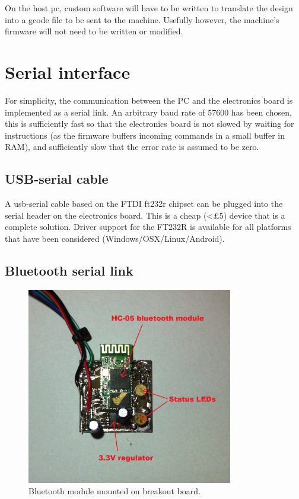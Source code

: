 \documentclass[a4paper,11pt]{article}  %
\begin{document}
On the host pc, custom software will have to be written to translate the design into a gcode file to be sent to the machine. Usefully however,
the machine's firmware will not need to be written or modified.

\section{Serial interface}
For simplicity, the communication between the PC and the electronics board is implemented as a serial link. An arbitrary baud rate of 57600 has been
chosen, this is sufficiently fast so that the electronics board is not slowed by waiting for instructions (as the firmware buffers incoming commands in
a small buffer in RAM), and sufficiently slow that the error rate is assumed to be zero.

\subsection{USB-serial cable}
A usb-serial cable based on the FTDI ft232r chipset can be plugged into the serial header on the electronics board. This is a cheap (<£5) device that is 
a complete solution. Driver support for the FT232R is available for all platforms that have been considered (Windows/OSX/Linux/Android).

\subsection{Bluetooth serial link}
\begin{figure}[ht!]
\centering
\includegraphics[width=90mm]{resources/bluetoothmodule.jpg}
\caption{Bluetooth module mounted on breakout board.}
\label{overflow}
\end{figure}
\end{document}
